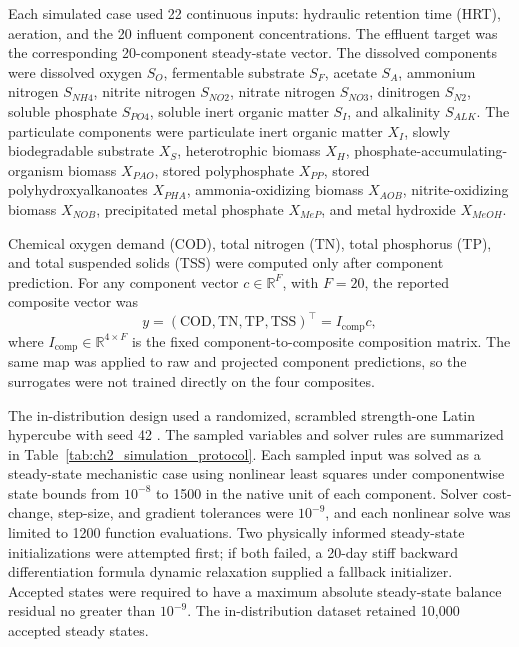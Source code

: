 \documentclass[12pt, twoside]{book}
\begin{document}
Each simulated case used 22 continuous inputs: hydraulic retention time (HRT), aeration, and the 20 influent
component concentrations. The effluent target was the corresponding 20-component steady-state vector. The
dissolved components were dissolved oxygen \(S_O\), fermentable substrate \(S_F\), acetate \(S_A\), ammonium
nitrogen \(S_{NH4}\), nitrite nitrogen \(S_{NO2}\), nitrate nitrogen \(S_{NO3}\), dinitrogen \(S_{N2}\),
soluble phosphate \(S_{PO4}\), soluble inert organic matter \(S_I\), and alkalinity \(S_{ALK}\). The
particulate components were particulate inert organic matter \(X_I\), slowly biodegradable substrate \(X_S\),
heterotrophic biomass \(X_H\), phosphate-accumulating-organism biomass \(X_{PAO}\), stored polyphosphate
\(X_{PP}\), stored polyhydroxyalkanoates \(X_{PHA}\), ammonia-oxidizing biomass \(X_{AOB}\),
nitrite-oxidizing biomass \(X_{NOB}\), precipitated metal phosphate \(X_{MeP}\), and metal hydroxide
\(X_{MeOH}\).

Chemical oxygen demand (COD), total nitrogen (TN), total phosphorus (TP), and total suspended solids (TSS)
were computed only after component prediction. For any component vector \(c\in\mathbb{R}^{F}\), with \(F=20\),
the reported composite vector was
\begin{equation}
\label{eq:ch2_composite_map}
y=(\mathrm{COD},\mathrm{TN},\mathrm{TP},\mathrm{TSS})^\top=I_{\mathrm{comp}}c,
\end{equation}
where \(I_{\mathrm{comp}}\in\mathbb{R}^{4\times F}\) is the fixed component-to-composite composition matrix.
The same map was applied to raw and projected component predictions, so the surrogates were not trained
directly on the four composites.

The in-distribution design used a randomized, scrambled strength-one Latin hypercube with seed 42
\citep{McKay1979}. The sampled variables and solver rules are summarized in
Table~\ref{tab:ch2_simulation_protocol}. Each sampled input was solved as a steady-state mechanistic case
using nonlinear least squares under componentwise state bounds from \(10^{-8}\) to 1500 in the native unit of
each component. Solver cost-change, step-size, and gradient tolerances were \(10^{-9}\), and each nonlinear
solve was limited to 1200 function evaluations. Two physically informed steady-state initializations were
attempted first; if both failed, a 20-day stiff backward differentiation formula dynamic relaxation supplied a
fallback initializer. Accepted states were required to have a maximum absolute steady-state balance residual no
greater than \(10^{-9}\). The in-distribution dataset retained 10,000 accepted steady states.
\end{document}
